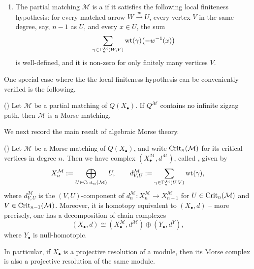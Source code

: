 \documentclass[a4paper,leqno]{amsart}
\begin{document}
\begin{dfn}
\begin{enumerate}
\item The partial matching $\mathcal M$ is a  if it satisfies the following local finiteness hypothesis: for every matched arrow $W\xrightarrow{w}U$, every vertex $V$ in the same degree, say, $n-1$ as $U$, and every $x\in U$, the sum
\[
 \sum_{\gamma\in\Gamma_n^{\mathcal M}(W,V)}
 \operatorname{wt}(\gamma)\bigl(-w^{-1}(x)\bigr)
\]
is well-defined, and it is non-zero for only finitely many vertices $V$.
\end{enumerate}
\end{dfn}

One special case where the the local finiteness hypothesis  can be conveniently verified is the following.

\begin{prop}\textnormal{(\cite[Proposition~3.2]{CLZ26})}
\label{prop:morse-sufficient-condition}
Let $\mathcal M$ be a partial matching of $Q(X_\bullet)$.  If $Q^{\mathcal M}$ contains no infinite zigzag path, then $\mathcal M$ is a Morse matching.
\end{prop}

We next record the main result of algebraic Morse theory.

\begin{thm}\textnormal{(\cite[Theorem~3.3]{CLZ26})}
\label{thm:algebraic-morse}
Let $\mathcal M$ be a Morse matching of $Q(X_\bullet)$, and write $\operatorname{Crit}_n(\mathcal M)$ for its critical vertices in degree $n$.  Then we have complex $(X_\bullet^{\mathcal{M}},d^{\mathcal{M}})$, called , given by
\[
 X_n^{\mathcal M}
 :=\bigoplus_{U\in\operatorname{Crit}_n(\mathcal M)}U,  \qquad d_{V,U}^{\mathcal M}
 :=\sum_{\gamma\in\Gamma_n^{\mathcal M}(U,V)} \operatorname{wt}(\gamma),
\]
where $d^{\mathcal{M}}_{V,U}$ is the $(V,U)$-component of $d_n^{\mathcal{M}}:X_n^{\mathcal{M}}\to X_{n-1}^{\mathcal{M}}$ for $U\in\operatorname{Crit}_n(\mathcal M)$ and $V\in\operatorname{Crit}_{n-1}(\mathcal M)$.
Moreover, it is homotopy equivalent to $(X_\bullet,d)$ -- more precisely, one has a decomposition of chain complexes
\[
 (X_\bullet,d)\cong
 (X_\bullet^{\mathcal M},d^{\mathcal M})
 \oplus(Y_\bullet,d^Y),
\]
where $Y_\bullet$ is null-homotopic.
\end{thm}

In particular, if $X_\bullet$ is a projective resolution of a module, then its Morse complex is also a projective resolution of the same module.
\end{document}
